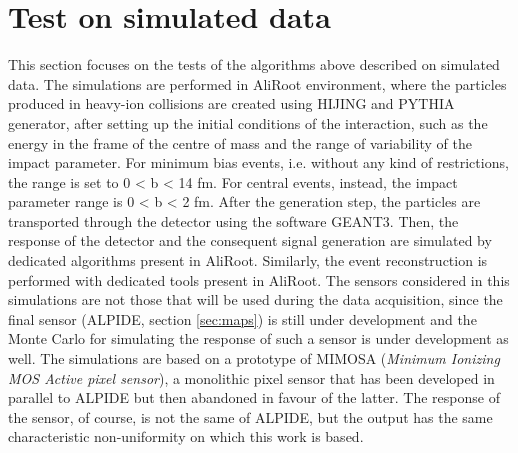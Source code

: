 \section{Test on simulated data}
This section focuses on the tests of the algorithms above described on simulated data. The simulations are performed in AliRoot environment, where the particles produced in heavy-ion collisions are created using HIJING and PYTHIA generator, after setting up the initial conditions of the interaction, such as the energy in the frame of the centre of mass and the range of variability of the impact parameter. For minimum bias events, i.e. without any kind of restrictions, the range is set to 0 < b < 14 fm. For central events, instead, the impact parameter range is 0 < b < 2 fm. After the generation step, the particles are transported through the detector using the software GEANT3. Then, the response of the detector and the consequent signal generation are simulated by dedicated algorithms present in AliRoot. Similarly, the event reconstruction is performed with dedicated tools present in AliRoot. The sensors considered in this simulations are not those that will be used during the data acquisition, since the final sensor (ALPIDE, section \ref{sec:maps}) is still under development and the Monte Carlo for simulating the response of such a sensor is under development as well. The simulations are based on a prototype of MIMOSA (\textit{Minimum Ionizing MOS Active pixel sensor}), a monolithic pixel sensor that has been developed in parallel to ALPIDE but then abandoned in favour of the latter. The response of the sensor, of course, is not the same of ALPIDE, but the output has the same characteristic non-uniformity on which this work is based.\\ 
%
